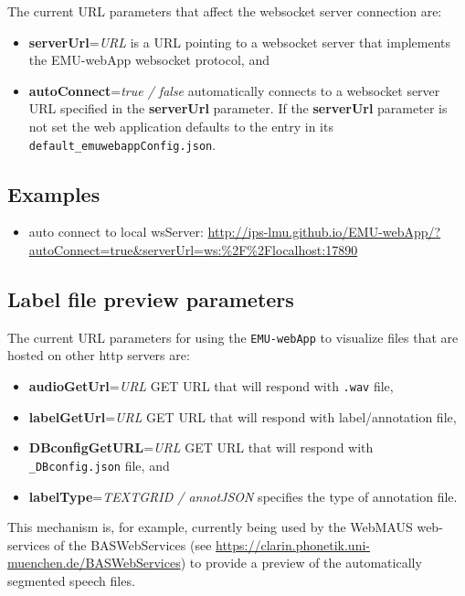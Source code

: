 \documentclass[]{book}
\providecommand{\tightlist}{%
  \setlength{\itemsep}{0pt}\setlength{\parskip}{0pt}}
\theoremstyle{definition}
\theoremstyle{definition}
\theoremstyle{definition}
\theoremstyle{remark}
\begin{document}
The current URL parameters that affect the websocket server connection
are:

\begin{itemize}
\tightlist
\item
  \textbf{serverUrl}=\emph{URL} is a URL pointing to a websocket server
  that implements the EMU-webApp websocket protocol, and
\item
  \textbf{autoConnect}=\emph{true / false} automatically connects to a
  websocket server URL specified in the \textbf{serverUrl} parameter. If
  the \textbf{serverUrl} parameter is not set the web application
  defaults to the entry in its \texttt{default\_emuwebappConfig.json}.
\end{itemize}

\hypertarget{examples}{%
\subsection{Examples}\label{examples}}

\begin{itemize}
\tightlist
\item
  auto connect to local wsServer:
  \url{http://ips-lmu.github.io/EMU-webApp/?autoConnect=true\&serverUrl=ws:\%2F\%2Flocalhost:17890}
\end{itemize}

\hypertarget{label-file-preview-parameters}{%
\subsection{Label file preview
parameters}\label{label-file-preview-parameters}}

The current URL parameters for using the \texttt{EMU-webApp} to
visualize files that are hosted on other http servers are:

\begin{itemize}
\tightlist
\item
  \textbf{audioGetUrl}=\emph{URL} GET URL that will respond with
  \texttt{.wav} file,
\item
  \textbf{labelGetUrl}=\emph{URL} GET URL that will respond with
  label/annotation file,
\item
  \textbf{DBconfigGetURL}=\emph{URL} GET URL that will respond with
  \texttt{\_DBconfig.json} file, and
\item
  \textbf{labelType}=\emph{TEXTGRID / annotJSON} specifies the type of
  annotation file.
\end{itemize}

This mechanism is, for example, currently being used by the WebMAUS
web-services of the BASWebServices (see
\url{https://clarin.phonetik.uni-muenchen.de/BASWebServices}) to provide
a preview of the automatically segmented speech files.
\end{document}
